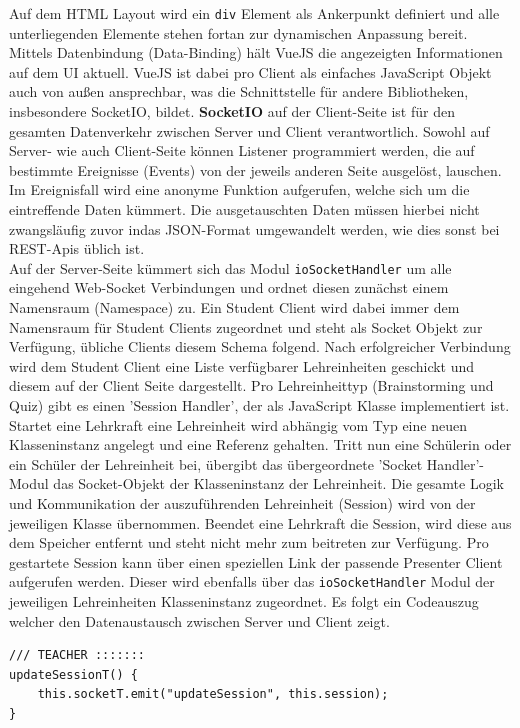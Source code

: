 Auf dem HTML Layout wird ein \texttt{div} Element als Ankerpunkt definiert und alle unterliegenden Elemente stehen fortan zur dynamischen Anpassung bereit. Mittels Datenbindung (Data-Binding) hält VueJS die angezeigten Informationen auf dem UI aktuell. VueJS ist dabei pro Client als einfaches JavaScript Objekt auch von außen ansprechbar, was die Schnittstelle für andere Bibliotheken, insbesondere SocketIO, bildet. \textbf{SocketIO} auf der Client-Seite ist für den gesamten Datenverkehr zwischen Server und Client verantwortlich. Sowohl auf Server- wie auch Client-Seite können Listener programmiert werden, die auf bestimmte Ereignisse (Events)  von der jeweils anderen Seite ausgelöst, lauschen. Im Ereignisfall wird eine anonyme Funktion aufgerufen, welche sich um die eintreffende Daten kümmert. Die ausgetauschten Daten müssen hierbei nicht zwangsläufig zuvor indas  JSON-Format umgewandelt werden, wie dies sonst bei REST-Apis üblich ist. \\ Auf der Server-Seite kümmert sich das Modul \texttt{ioSocketHandler} um alle eingehend Web-Socket Verbindungen und ordnet diesen zunächst einem Namensraum (Namespace) zu. Ein Student Client wird dabei immer dem Namensraum für Student Clients zugeordnet und steht als Socket Objekt zur Verfügung, übliche Clients diesem Schema folgend.  Nach erfolgreicher Verbindung wird dem Student Client eine Liste verfügbarer Lehreinheiten geschickt und diesem auf der Client Seite dargestellt. Pro Lehreinheittyp (Brainstorming und Quiz) gibt es einen  'Session Handler', der als JavaScript Klasse implementiert ist. Startet eine Lehrkraft eine Lehreinheit wird abhängig vom Typ eine neuen Klasseninstanz angelegt und eine Referenz gehalten. Tritt nun eine Schülerin oder ein Schüler der Lehreinheit bei, übergibt das übergeordnete 'Socket Handler'-Modul das Socket-Objekt der Klasseninstanz der Lehreinheit. Die gesamte Logik und Kommunikation der auszuführenden Lehreinheit (Session) wird von der jeweiligen Klasse übernommen. Beendet eine Lehrkraft die Session, wird diese aus dem Speicher entfernt und steht nicht mehr zum beitreten zur Verfügung. Pro gestartete Session kann über einen speziellen Link der passende Presenter Client aufgerufen werden. Dieser wird ebenfalls über das \texttt{ioSocketHandler} Modul der jeweiligen Lehreinheiten Klasseninstanz zugeordnet. Es folgt ein Codeauszug welcher den Datenaustausch zwischen Server und Client zeigt.
\begin{lstlisting}[caption=Server Socket Event Emitierung]
/// TEACHER :::::::
updateSessionT() {
	this.socketT.emit("updateSession", this.session);
}
\end{lstlisting}
